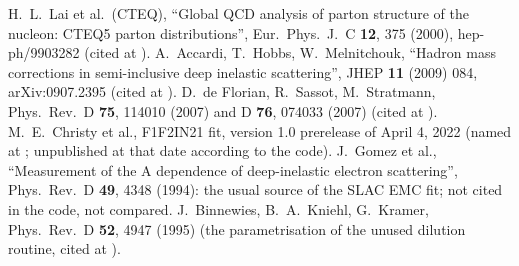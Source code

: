 \documentclass{simcnote}
\begin{document}
\begin{simcrefs}
 H.~L.~Lai et al.\ (CTEQ), ``Global QCD analysis of parton structure of the nucleon: CTEQ5 parton
  distributions'', Eur.\ Phys.\ J.\ C \textbf{12}, 375 (2000), hep-ph/9903282 (cited at ).
 A.~Accardi, T.~Hobbs, W.~Melnitchouk, ``Hadron mass corrections in semi-inclusive deep inelastic
  scattering'', JHEP \textbf{11} (2009) 084, arXiv:0907.2395 (cited at ).
 D.~de Florian, R.~Sassot, M.~Stratmann, Phys.\ Rev.\ D \textbf{75}, 114010 (2007) and D \textbf{76},
  074033 (2007) (cited at ).
 M.~E.~Christy et al., F1F2IN21 fit, version 1.0 prerelease of April 4, 2022 (named at
  ; unpublished at that date according to the code).
 J.~Gomez et al., ``Measurement of the A dependence of deep-inelastic electron scattering'', Phys.\ Rev.\ D
  \textbf{49}, 4348 (1994): the usual source of the SLAC EMC fit; not cited in the code, not compared.
 J.~Binnewies, B.~A.~Kniehl, G.~Kramer, Phys.\ Rev.\ D \textbf{52}, 4947 (1995) (the parametrisation of
  the unused dilution routine, cited at ).
\end{simcrefs}
\end{document}
